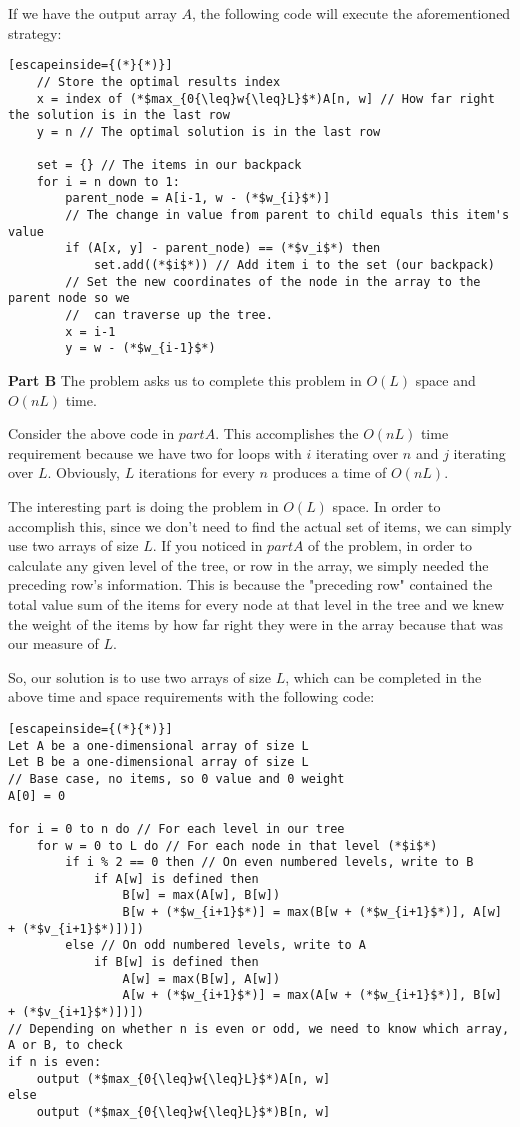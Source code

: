 \documentclass{article}
\begin{document}
	If we have the output array $A$, the following code will execute the aforementioned strategy:

	\begin{lstlisting}[escapeinside={(*}{*)}]
	// Store the optimal results index
	x = index of (*$max_{0{\leq}w{\leq}L}$*)A[n, w] // How far right the solution is in the last row
	y = n // The optimal solution is in the last row

	set = {} // The items in our backpack
	for i = n down to 1:
		parent_node = A[i-1, w - (*$w_{i}$*)]
		// The change in value from parent to child equals this item's value
		if (A[x, y] - parent_node) == (*$v_i$*) then
			set.add((*$i$*)) // Add item i to the set (our backpack)
		// Set the new coordinates of the node in the array to the parent node so we
		// 	can traverse up the tree.
		x = i-1
		y = w - (*$w_{i-1}$*)
	\end{lstlisting}

	\textbf{Part B} The problem asks us to complete this problem in $O(L)$ space and $O(nL)$ time.\par \medskip

	Consider the above code in $part A$.  This accomplishes the $O(nL)$ time requirement because we have two for loops with $i$ iterating over $n$ and $j$ iterating over $L$.  Obviously, $L$ iterations for every $n$ produces a time of $O(nL)$.\par \medskip

	The interesting part is doing the problem in $O(L)$ space.  In order to accomplish this, since we don't need to find the actual set of items, we can simply use two arrays of size $L$.  If you noticed in $part A$ of the problem, in order to calculate any given level of the tree, or row in the array, we simply needed the preceding row's information.  This is because the "preceding row" contained the total value sum of the items for every node at that level in the tree and we knew the weight of the items by how far right they were in the array because that was our measure of $L$.\par \medskip

	So, our solution is to use two arrays of size $L$, which can be completed in the above time and space requirements with the following code:
	\begin{lstlisting}[escapeinside={(*}{*)}]
Let A be a one-dimensional array of size L
Let B be a one-dimensional array of size L
// Base case, no items, so 0 value and 0 weight
A[0] = 0

for i = 0 to n do // For each level in our tree
	for w = 0 to L do // For each node in that level (*$i$*)
		if i % 2 == 0 then // On even numbered levels, write to B
			if A[w] is defined then
				B[w] = max(A[w], B[w])
				B[w + (*$w_{i+1}$*)] = max(B[w + (*$w_{i+1}$*)], A[w] + (*$v_{i+1}$*)])])
		else // On odd numbered levels, write to A
			if B[w] is defined then
				A[w] = max(B[w], A[w])
				A[w + (*$w_{i+1}$*)] = max(A[w + (*$w_{i+1}$*)], B[w] + (*$v_{i+1}$*)])])
// Depending on whether n is even or odd, we need to know which array, A or B, to check
if n is even:
	output (*$max_{0{\leq}w{\leq}L}$*)A[n, w]
else
	output (*$max_{0{\leq}w{\leq}L}$*)B[n, w]
	\end{lstlisting}
\end{document}

